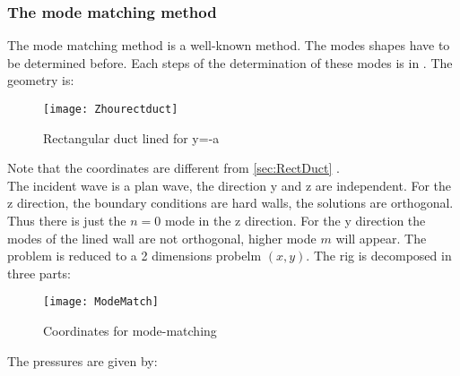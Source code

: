 \subsubsection{The mode matching method}
The mode matching method is a well-known method. The modes shapes have to be determined before. Each steps of the determination of these modes is in . The geometry is: 
\begin{figure}[H] \centering
    \texttt{[image: Zhourectduct]}
    \caption{Rectangular duct lined for y=-a}
\end{figure}
\noindent Note that the coordinates are different from \ref{sec:RectDuct} .\\
The incident wave is a plan wave, the direction y and z are independent. For the z direction, the boundary conditions are hard walls, the solutions are orthogonal. Thus there is just the $n=0$ mode in the z direction. For the y direction the modes of the lined wall are not orthogonal, higher mode $m$ will appear. The problem is reduced to a 2 dimensions probelm $(x,y)$.
The rig is decomposed in three parts:
\begin{figure}[H] \centering
    \texttt{[image: ModeMatch]}
    \caption{Coordinates for mode-matching }
\end{figure}
The pressures are given by:
